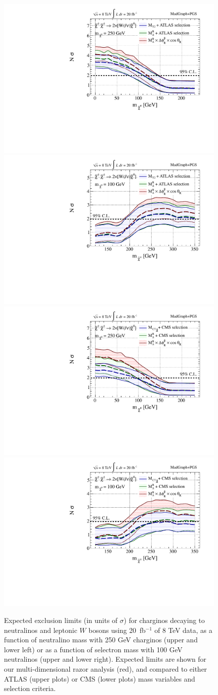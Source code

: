 \begin{figure}[!hb]
\includegraphics[width=0.40\columnwidth]{fig/sectionV/LIMIT1D_chargino_ATLAS_MXpm250.pdf}
\includegraphics[width=0.40\columnwidth]{fig/sectionV/LIMIT1D_chargino_ATLAS_MX0100.pdf}
\includegraphics[width=0.40\columnwidth]{fig/sectionV/LIMIT1D_chargino_CMS_MXpm250.pdf}
\includegraphics[width=0.40\columnwidth]{fig/sectionV/LIMIT1D_chargino_CMS_MX0100.pdf}
\caption{Expected exclusion limits (in units of $\sigma$) for charginos decaying to neutralinos and leptonic $W$ bosons using 20~fb$^{-1}$ of 8 TeV data, as a function of neutralino mass with 250 GeV charginos (upper and lower left) or as a function of selectron mass with 100 GeV neutralinos (upper and lower right). Expected limits are shown for our multi-dimensional razor analysis (red), and compared to either ATLAS (upper plots) or CMS (lower plots) mass variables and selection criteria. \label{fig:results_chargino_1D_compare}}
\end{figure}
